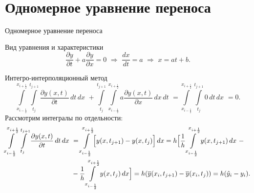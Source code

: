 \documentclass[unicode, 8pt]{beamer}
\newcommand{\half}{\frac{1}{2}}
\begin{document}
    \section{Одномерное уравнение переноса}
    \begin{frame}{Одномерное уравнение переноса}
       \begin{block}{Вид уравнения и характеристики}
        \begin{equation}
            \label{convection-diffusion}
            \dfrac{\partial y}{\partial t} + a \dfrac{\partial y}{\partial x} = 0 \,\, \Rightarrow \,\, \dfrac{dx}{dt} = a \,\, \Rightarrow \,\, x = a t + b.
        \end{equation}
       \end{block}

       \begin{block}{Интегро-интерполяционный метод}
            \[
                \int \limits_{x_{i-\half}}^{x_{i+\half}} \int \limits_{t_j}^{t_{j+1}} \dfrac{ \partial y(x, t) }{ \partial t } \, dt \, dx \,\, + \int \limits_{t_j}^{t_{j+1}} \int \limits_{x_{i-\half}}^{x_{i+\half}} a \dfrac{ \partial y(x,t) }{ \partial x } \, dx \, dt \,\, = \int \limits_{x_{i-\half}}^{x_{i+\half}} \int \limits_{t_j}^{t_{j+1}} 0 \, dt \, dx \, \, = 0.
            \]
            Рассмотрим интегралы по отдельности: 
            \[
                \begin{split}
                    \int \limits_{x_{i-\half}}^{x_{i+\half}} \int \limits_{t_j}^{t_{j+1}} \dfrac{ \partial y(x, t) }{ \partial t } \, dt \, dx \,\, &= \int \limits_{x_{i-\half}}^{x_{i+\half}} \Bigl[ y(x, t_{j+1}) - y(x, t_j)  \Bigr] \, dx = h \Bigl[ \dfrac{1}{h} \int \limits_{x_{i-\half}}^{x_{i+\half}} y(x, t_{j+1}) \, dx \,\,  -  
                    \\ 
                    &- \dfrac{1}{h} \int \limits_{x_{i-\half}}^{x_{i+\half}} y(x, t_j) \, dx \Bigr] = h ( \overline y(x_i, t_{j+1}) - \overline y(x_i, t_j) ) = h( \hat y_i - y_i).
                \end{split}
            \]
       \end{block}
    \end{frame}
\end{document}
